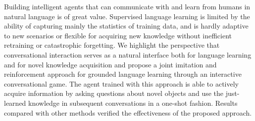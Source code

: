 Building intelligent agents that can communicate with and learn from humans in natural language is of great value. Supervised language learning is limited by the ability of capturing mainly the statistics of training data, and is hardly adaptive to new scenarios or flexible for acquiring new knowledge without inefficient retraining or catastrophic forgetting. We highlight the perspective that conversational interaction serves as a natural interface  both for  language learning and  for novel knowledge acquisition and  propose a joint imitation and reinforcement approach for grounded language learning through an interactive conversational game. The agent trained with this approach is able to actively acquire information by asking questions about novel objects and use the just-learned knowledge in subsequent conversations in a one-shot fashion. Results compared with other methods verified the effectiveness of the proposed approach.
